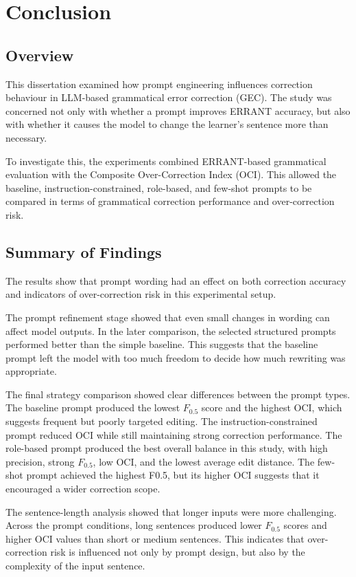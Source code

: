 \chapter{Conclusion}

\section{Overview}

This dissertation examined how prompt engineering influences correction behaviour in LLM-based grammatical error correction (GEC). The study was concerned not only with whether a prompt improves ERRANT accuracy, but also with whether it causes the model to change the learner's sentence more than necessary.

To investigate this, the experiments combined ERRANT-based grammatical evaluation with the Composite Over-Correction Index (OCI). This allowed the baseline, instruction-constrained, role-based, and few-shot prompts to be compared in terms of grammatical correction performance and over-correction risk.

\section{Summary of Findings}

The results show that prompt wording had an effect on both correction accuracy and indicators of over-correction risk in this experimental setup.

The prompt refinement stage showed that even small changes in wording can affect model outputs. In the later comparison, the selected structured prompts performed better than the simple baseline. This suggests that the baseline prompt left the model with too much freedom to decide how much rewriting was appropriate.

The final strategy comparison showed clear differences between the prompt types. The baseline prompt produced the lowest $F_{0.5}$ score and the highest OCI, which suggests frequent but poorly targeted editing. The instruction-constrained prompt reduced OCI while still maintaining strong correction performance. The role-based prompt produced the best overall balance in this study, with high precision, strong $F_{0.5}$, low OCI, and the lowest average edit distance. The few-shot prompt achieved the highest F0.5, but its higher OCI suggests that it encouraged a wider correction scope.

The sentence-length analysis showed that longer inputs were more challenging. Across the prompt conditions, long sentences produced lower $F_{0.5}$ scores and higher OCI values than short or medium sentences. This indicates that over-correction risk is influenced not only by prompt design, but also by the complexity of the input sentence.

